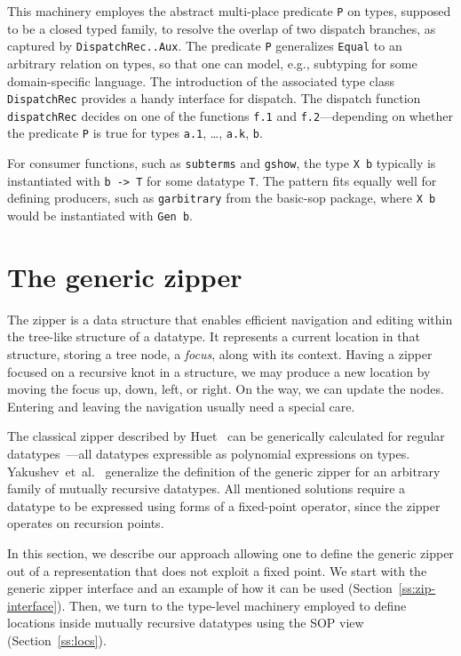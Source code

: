 \documentclass[runningheads]{llncs}
\newcommand{\K}[1]{\lstinline[style=fancy]{#1}}
\begin{document}
This machinery employes the abstract multi-place predicate \K{P} on types, supposed to be a closed typed family, to resolve the overlap of two dispatch branches, as captured by \K{DispatchRec..Aux}. The predicate \K{P} generalizes \K{Equal} to an arbitrary relation on types, so that one can model, e.g., subtyping for some domain-specific language. The introduction of the associated type class \K{DispatchRec} provides a handy interface for dispatch. The dispatch function \K{dispatchRec} decides on one of the functions \K{f.1} and \K{f.2}---depending on whether the predicate \K{P} is true for types \K{a.1}, \dots, \K{a.k}, \K{b}.

For consumer functions, such as \K{subterms} and \K{gshow}, the type \K{X b} typically is instantiated with \K{b -> T} for some datatype \K{T}. The pattern fits equally well for defining producers, such as \K{garbitrary} from the \textsf{basic-sop} package, where \K{X b} would be instantiated with \K{Gen b}.


\section{The generic zipper}
\label{sec:generic-zipper}


The zipper is a data structure that enables efficient navigation and editing within the tree-like structure of a datatype. It represents a current location in that structure, storing a tree node, a \emph{focus}, along with its context. Having a zipper focused on a recursive knot in a structure, we may produce a new location by moving the focus up, down, left, or right. On the way, we can update the nodes. Entering and leaving the navigation usually need a special care.

The classical zipper described by Huet~\cite{Huet1997} can be generically calculated for regular datatypes~\cite{HiJeLo2004}---all datatypes expressible as polynomial expressions on types. Yakushev~et~al.~\cite{MuRec2009} generalize the definition of the generic zipper for an arbitrary family of mutually recursive datatypes. All mentioned solutions require a datatype to be expressed using forms of a fixed-point operator, since the zipper operates on recursion points. 

In this section, we describe our approach allowing one to define the generic zipper out of a representation that does not exploit a fixed point. We start with the generic zipper interface and an example of how it can be used (Section~\ref{ss:zip-interface}). Then, we turn to the type-level machinery employed to define locations inside mutually recursive datatypes using the SOP view  (Section~\ref{ss:locs}).
\end{document}
